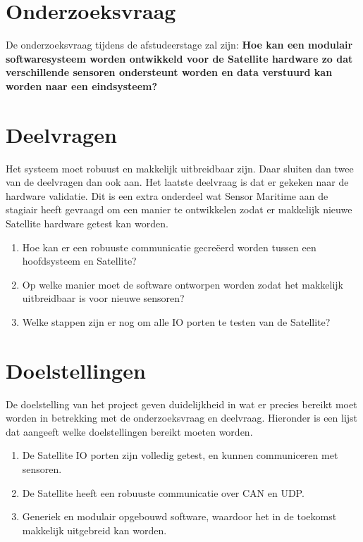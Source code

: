 \section{Onderzoeksvraag}
De onderzoeksvraag tijdens de afstudeerstage zal zijn: \textbf{Hoe kan een modulair softwaresysteem worden ontwikkeld voor de Satellite hardware zo dat verschillende sensoren ondersteunt worden en data verstuurd kan worden naar een eindsysteem?}

\section{Deelvragen}
Het systeem moet robuust en makkelijk uitbreidbaar zijn. Daar sluiten dan twee van de deelvragen dan ook aan. Het laatste deelvraag is dat er gekeken naar de hardware validatie. Dit is een extra onderdeel wat Sensor Maritime aan de stagiair heeft gevraagd om een manier te ontwikkelen zodat er makkelijk nieuwe Satellite hardware getest kan worden.
\begin{enumerate}
	\item Hoe kan er een robuuste  communicatie gecreëerd worden tussen een hoofdsysteem en Satellite?
	\item Op welke manier moet de software ontworpen worden zodat het makkelijk uitbreidbaar is voor nieuwe sensoren?
	\item Welke stappen zijn er nog om alle IO porten te testen van de Satellite?
\end{enumerate}

\section{Doelstellingen}
De doelstelling van het project geven duidelijkheid in wat er precies bereikt moet worden in betrekking met de onderzoeksvraag en deelvraag. Hieronder is een lijst dat aangeeft welke doelstellingen bereikt moeten worden.
\begin{enumerate}
	\item De Satellite IO porten zijn volledig getest, en kunnen communiceren met sensoren.
	\item De Satellite heeft een robuuste communicatie over CAN en UDP. 
	\item Generiek en modulair opgebouwd software, waardoor het in de toekomst makkelijk uitgebreid kan worden.
\end{enumerate}

\newpage
